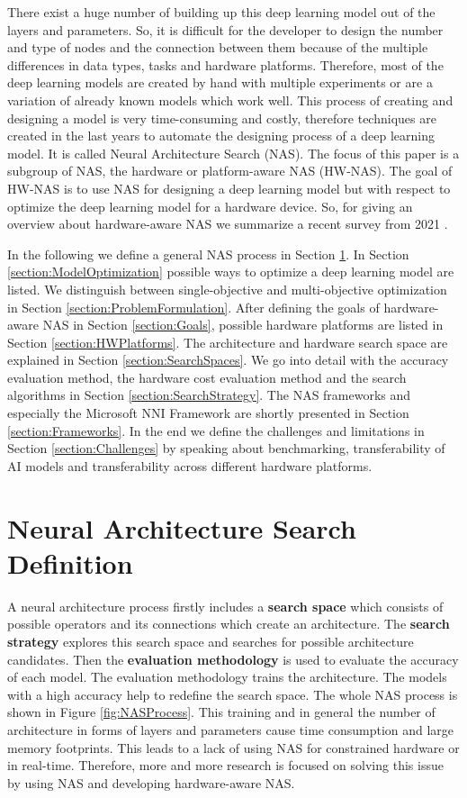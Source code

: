 \documentclass[conference]{IEEEtran}
\begin{document}
There exist a huge number of building up this deep learning model out of the layers and parameters. So, it is difficult for the developer to design the number and type of nodes and the connection between them because of the multiple differences in data types, tasks and hardware platforms. Therefore, most of the deep learning models are created by hand with multiple experiments or are a variation of already known models which work well. This process of creating and designing a model is very time-consuming and costly, therefore techniques are created in the last years to automate the designing process of a deep learning model. It is called Neural Architecture Search (NAS). The focus of this paper is a subgroup of NAS, the hardware or platform-aware NAS (HW-NAS). The goal of HW-NAS is to use NAS for designing a deep learning model but with respect to optimize the deep learning model for a hardware device. So, for giving an overview about hardware-aware NAS we summarize a recent survey from 2021 \cite{bib1}. 

In the following we define a general NAS process in Section \ref{section:NASDefinition}. In Section \ref{section:ModelOptimization} possible ways to optimize a deep learning model are listed. We distinguish between single-objective and multi-objective optimization in Section \ref{section:ProblemFormulation}. After defining the goals of hardware-aware NAS in Section \ref{section:Goals}, possible hardware platforms are listed in Section \ref{section:HWPlatforms}. The architecture and hardware search space are explained in Section \ref{section:SearchSpaces}. We go into detail with the accuracy evaluation method, the hardware cost evaluation method and the search algorithms in Section \ref{section:SearchStrategy}. The NAS frameworks and especially the Microsoft NNI Framework are shortly presented in Section \ref{section:Frameworks}. In the end we define the challenges and limitations in Section \ref{section:Challenges} by speaking about benchmarking, transferability of AI models and transferability across different hardware platforms.  

\section{Neural Architecture Search Definition}
\label{section:NASDefinition}
A neural architecture process firstly includes a \textbf{search space} which consists of possible operators and its connections which create an architecture. The \textbf{search strategy} explores this search space and searches for possible architecture candidates. Then the \textbf{evaluation methodology} is used to evaluate the accuracy of each model. The evaluation methodology trains the architecture. The models with a high accuracy help to redefine the search space. The whole NAS process is shown in Figure \ref{fig:NASProcess}\cite{bib8}. This training and in general the  number of architecture in forms of layers and parameters cause time consumption and large memory footprints. This leads to a lack of using NAS for constrained hardware or in real-time. Therefore, more and more research is focused on solving this issue by using NAS and developing hardware-aware NAS. 
\end{document}
